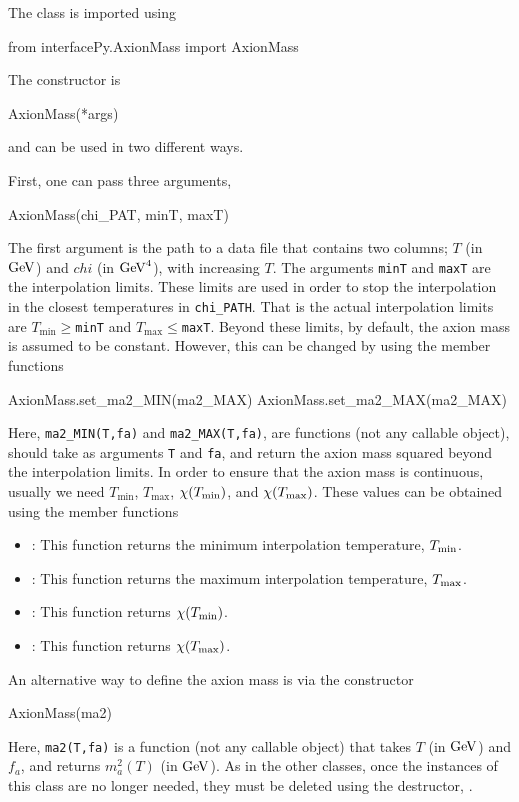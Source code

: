 \documentclass[11pt,a4paper]{article}
\begin{document}
The class is imported using 
%
\begin{py}
	from interfacePy.AxionMass import AxionMass
\end{py}

The constructor is
%
\begin{py}
	AxionMass(*args)
\end{py}
%
and can be used in two different ways. 

First, one can pass three arguments, \ie
%
\begin{py}
	AxionMass(chi_PAT, minT, maxT)
\end{py}
%
The first argument is the path to a data file that contains two columns; $T$ (in ${\rm GeV}$) and $chi$ (in ${\rm GeV}^4$), with increasing $T$. The arguments {\tt minT} and {\tt maxT} are the interpolation limits. These limits are used in order to stop the interpolation in the closest temperatures in {\tt chi\_PATH}. That is the actual interpolation limits are $T_{\min}\geq${\tt minT} and $T_{\max}\leq${\tt maxT}. Beyond these limits, by default, the axion mass is assumed to be constant. However, this can be changed by using the member functions
%
\begin{py}
	AxionMass.set_ma2_MIN(ma2_MAX)
	AxionMass.set_ma2_MAX(ma2_MAX)
\end{py}
%
Here, {\tt ma2\_MIN(T,fa)} and {\tt ma2\_MAX(T,fa)}, are functions (not any callable object), should take as arguments {\tt T} and {\tt fa}, and return the axion mass squared beyond the interpolation limits. In order to ensure that the axion mass is continuous, usually we need $T_{\min}$, $T_{\max}$, $\chi(T_{\rm min})$, and $\chi(T_{\rm max})$. These values can be obtained using the member functions
%
\begin{itemize}
	\item {}: This function returns the minimum interpolation temperature, $T_{\rm min}$. 
	\item {}: This function returns the maximum interpolation temperature, $T_{\rm max}$.
	\item {}: This function returns $\chi(T_{\rm min})$.
	\item {}: This function returns $\chi(T_{\rm max})$.
\end{itemize}

An alternative way to define the axion mass is via the constructor
%
\begin{cpp}
	AxionMass(ma2)
\end{cpp}
%
Here, {\tt ma2(T,fa)} is a function (not any callable object) that takes $T$ (in ${\rm GeV}$) and $f_a$, and returns  $m_a^2(T)$ (in ${\rm GeV}$). As in the other \PY classes, once the instances of this class are no longer needed, they must be deleted using the destructor, . 
\end{document}
